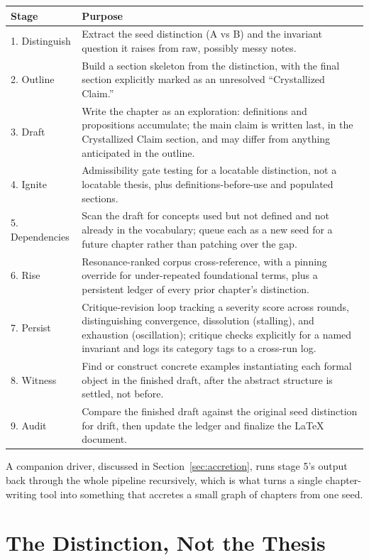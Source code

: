 \documentclass[11pt]{article}
\theoremstyle{definition}
\begin{document}
\begin{longtable}{@{}p{}p{}@{}}
\textbf{Stage} & \textbf{Purpose} \\ \hline
\endhead
1. Distinguish & Extract the seed distinction (A vs B) and the invariant
question it raises from raw, possibly messy notes. \\
2. Outline & Build a section skeleton from the distinction, with the
final section explicitly marked as an unresolved ``Crystallized Claim.'' \\
3. Draft & Write the chapter as an exploration: definitions and
propositions accumulate; the main claim is written last, in the
Crystallized Claim section, and may differ from anything anticipated
in the outline. \\
4. Ignite & Admissibility gate testing for a locatable distinction, not
a locatable thesis, plus definitions-before-use and populated sections. \\
5. Dependencies & Scan the draft for concepts used but not defined and
not already in the vocabulary; queue each as a new seed for a future
chapter rather than patching over the gap. \\
6. Rise & Resonance-ranked corpus cross-reference, with a pinning
override for under-repeated foundational terms, plus a persistent
ledger of every prior chapter's distinction. \\
7. Persist & Critique-revision loop tracking a severity score across
rounds, distinguishing convergence, dissolution (stalling), and
exhaustion (oscillation); critique checks explicitly for a named
invariant and logs its category tags to a cross-run log. \\
8. Witness & Find or construct concrete examples instantiating each
formal object in the finished draft, after the abstract structure is
settled, not before. \\
9. Audit & Compare the finished draft against the original seed
distinction for drift, then update the ledger and finalize the LaTeX
document. \\
\end{longtable}

A companion driver, discussed in Section~\ref{sec:accretion}, runs
stage 5's output back through the whole pipeline recursively, which is
what turns a single chapter-writing tool into something that accretes a
small graph of chapters from one seed.

\section{The Distinction, Not the Thesis}
\label{sec:distinguish}
\end{document}

